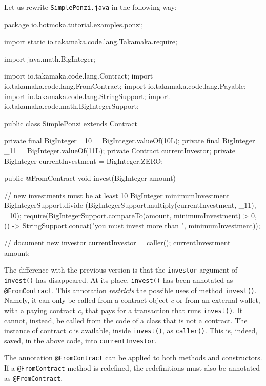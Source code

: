 Let us rewrite \texttt{SimplePonzi.java} in the following way:
%
\begin{codebox}\begin{javalst}
package io.hotmoka.tutorial.examples.ponzi;

import static io.takamaka.code.lang.Takamaka.require;

import java.math.BigInteger;

import io.takamaka.code.lang.Contract;
import io.takamaka.code.lang.FromContract;
import io.takamaka.code.lang.Payable;
import io.takamaka.code.lang.StringSupport;
import io.takamaka.code.math.BigIntegerSupport;

public class SimplePonzi extends Contract {
  private final BigInteger _10 = BigInteger.valueOf(10L);
  private final BigInteger _11 = BigInteger.valueOf(11L);
  private Contract currentInvestor;
  private BigInteger currentInvestment = BigInteger.ZERO;

  public @FromContract void invest(BigInteger amount) {
    // new investments must be at least 10%
    BigInteger minimumInvestment = BigIntegerSupport.divide
      (BigIntegerSupport.multiply(currentInvestment, _11), _10);
    require(BigIntegerSupport.compareTo(amount, minimumInvestment) > 0,
      () -> StringSupport.concat("you must invest more than ", minimumInvestment));

    // document new investor
    currentInvestor = caller();
    currentInvestment = amount;
  }
}
\end{javalst}\end{codebox}

The difference with the previous version
is that the \texttt{investor} argument of \texttt{invest()} has disappeared.
At its place, \texttt{invest()} has been annotated as
\texttt{@FromContract}.
This annotation
\emph{restricts} the possible uses of method \texttt{invest()}. Namely, it can
only be called from a contract object \emph{c} or from an external wallet,
with a paying contract \emph{c}, that pays for a transaction that runs
\texttt{invest()}. It cannot, instead, be called from
the code of a class that is not a contract.
The instance of contract \emph{c} is available, inside
\texttt{invest()}, as \texttt{caller()}.
This is, indeed, saved, in the above code,
into \texttt{currentInvestor}.

The annotation \texttt{@FromContract} can be applied to both methods and constructors.
If a \texttt{@FromContract} method is redefined, the redefinitions must also be
annotated as \texttt{@FromContract}.

